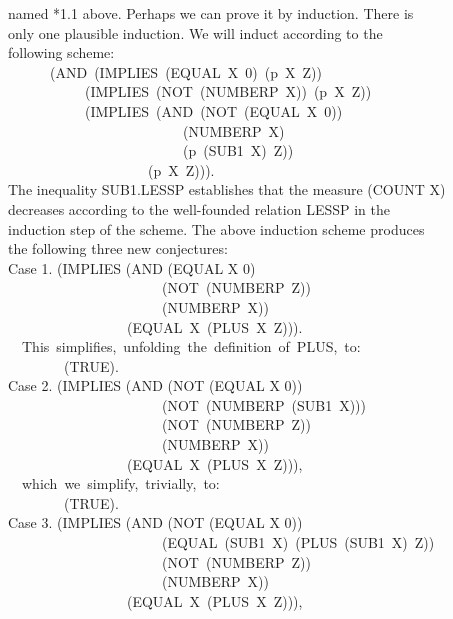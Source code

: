 \documentclass[10pt]{book}
\newenvironment{pubasis}{\begin{flushleft}}{\end{flushleft}}
\begin{document}
\begin{pubasis}
named *1.1 above.  Perhaps we can prove it by induction.  There is\\
only one plausible induction.  We will induct according to the\\
following scheme:\\
~~~~~~(AND~(IMPLIES~(EQUAL~X~0)~(p~X~Z))\\
~~~~~~~~~~~(IMPLIES~(NOT~(NUMBERP~X))~(p~X~Z))\\
~~~~~~~~~~~(IMPLIES~(AND~(NOT~(EQUAL~X~0))\\
~~~~~~~~~~~~~~~~~~~~~~~~~(NUMBERP~X)\\
~~~~~~~~~~~~~~~~~~~~~~~~~(p~(SUB1~X)~Z))\\
~~~~~~~~~~~~~~~~~~~~(p~X~Z))).\\
The inequality SUB1.LESSP establishes that the measure (COUNT X)\\
decreases according to the well-founded relation LESSP in the\\
induction step of the scheme.  The above induction scheme produces\\
the following three new conjectures:\\

Case 1.	(IMPLIES (AND (EQUAL X 0)\\
~~~~~~~~~~~~~~~~~~~~~~(NOT~(NUMBERP~Z))\\
~~~~~~~~~~~~~~~~~~~~~~(NUMBERP~X))\\
~~~~~~~~~~~~~~~~~(EQUAL~X~(PLUS~X~Z))).\\

~~This~simplifies,~unfolding~the~definition~of~PLUS,~to:\\

~~~~~~~~(TRUE).\\

Case 2.	(IMPLIES (AND (NOT (EQUAL X 0))\\
~~~~~~~~~~~~~~~~~~~~~~(NOT~(NUMBERP~(SUB1~X)))\\
~~~~~~~~~~~~~~~~~~~~~~(NOT~(NUMBERP~Z))\\
~~~~~~~~~~~~~~~~~~~~~~(NUMBERP~X))\\
~~~~~~~~~~~~~~~~~(EQUAL~X~(PLUS~X~Z))),\\

~~which~we~simplify,~trivially,~to:\\

~~~~~~~~(TRUE).\\

Case 3.	(IMPLIES (AND (NOT (EQUAL X 0))\\
~~~~~~~~~~~~~~~~~~~~~~(EQUAL~(SUB1~X)~(PLUS~(SUB1~X)~Z))\\
~~~~~~~~~~~~~~~~~~~~~~(NOT~(NUMBERP~Z))\\
~~~~~~~~~~~~~~~~~~~~~~(NUMBERP~X))\\
~~~~~~~~~~~~~~~~~(EQUAL~X~(PLUS~X~Z))),\\


\end{pubasis}
\end{document}
